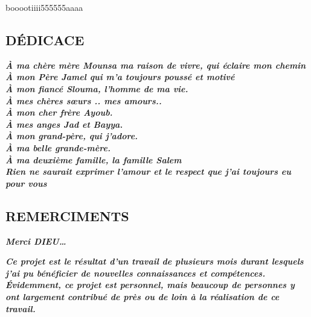 \documentclass[12pt, a4paper]{thesis}
\begin{document}
booootiiii555555aaaa



\newpage
\vspace*{100\p@}
\pagestyle{fancy}
\vspace*{10\p@}

\vspace*{10\p@}

\begin{center}
\section*{DÉDICACE}
\end{center}
\vspace*{40\p@}
\begin{center}

\textbf{\textit{
À ma chère mère Mounsa ma raison de vivre, qui éclaire mon chemin\\
À mon Père Jamel qui m'a toujours poussé et motivé\\
À mon fiancé Slouma, l'homme de ma vie. \\
À mes chères sœurs .. mes amours..\\
À mon cher frère Ayoub.\\
À mes anges Jad et Bayya.\\
À mon grand-père, qui j'adore.\\
À ma belle grande-mère.\\
À ma deuxième famille, la famille Salem\\
Rien ne saurait exprimer l’amour et le respect que j’ai toujours eu pour vous\\
}}
\end{center}
\vspace*{100\p@}


\newpage
\vspace*{10\p@}
\begin{center}

\section*{REMERCIMENTS}

\end{center}
\vspace*{20\p@}

\textbf{\textit{
Merci DIEU…\\} }

\textbf{\textit{
Ce projet est le résultat d’un travail de plusieurs mois durant lesquels j’ai pu bénéficier de nouvelles connaissances et compétences. Évidemment, ce projet est personnel, mais beaucoup de personnes y ont largement contribué de près ou de loin à la réalisation de ce travail.\\} }
\end{document}
